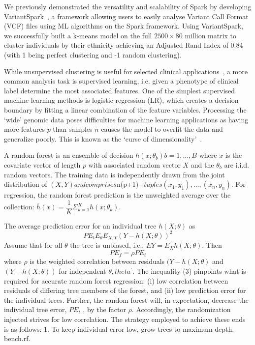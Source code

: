 \documentclass[10pt,letterpaper]{article}
\begin{document}
We previously demonstrated the versatility and scalability of Spark by developing VariantSpark~\cite{OBrien2015}, a
framework allowing users to easily analyse Variant Call Format (VCF) files using ML algorithms on the Spark framework.
Using VariantSpark, we successfully built a k-means model on the full
$2500 \times 80$ million matrix to cluster individuals by
their ethnicity achieving an Adjusted Rand Index of 0.84 (with 1 being perfect clustering  and -1 random clustering).


While unsupervised clustering is useful for selected clinical applications~\cite{Li2015}, a more common analysis task is
supervised learning, i.e. given a phenotype of clinical label determine the most associated features.  One of the
simplest supervised machine learning methods is logistic regression (LR), which creates a decision boundary by fitting a
linear combination of the feature variables.  Processing the `wide' genomic data poses difficulties for machine learning
applications as having more features $p$ than samples $n$ causes the model to overfit the data and generalize poorly.
This is known as the `curse of dimensionality'~\cite{Bauer2014}.  


A random forest is an ensemble  of decision $h(x; \theta_b) b=1, \ldots, B$ where
$x$ is the covariate vector of length $p$ with associated
random vector $X$ and the $\theta_b$ are i.i.d. random vectors. 
The training  data is independently drawn from the joint distribution of $(X,Y)
and comprises $n$  $(p+1)$-tuples (x_1,y_1),\ldots, (x_n,y_n)$.
For regression, the random forest prediction is the unweighted average over
the collection: $\bar{h}(x)=\dfrac{1}{K}\Sigma_{k=1}^K h(x; \theta_k)$.

The average prediction error for an individual tree $h(X; \theta)$ as
\begin{equation}
PE_t E_\theta E_{X,Y} (Y-h(X; \theta))^2
\end{equation}
Assume that for all  $\theta$ the tree is unbiased, i.e., $EY=E_Xh(X; \theta)$. Then
\begin{equation}
PE_f = \rho PE_t
\end{equation}
where $\rho$ is the weighted correlation between residuals
$(Y-h(X;\theta)$ and  $(Y-h(X;\theta))$
for independent $\theta, theta^\prime$.
The inequality (3) pinpoints what is required for accurate random forest regression:
(i) low correlation between residuals of differing tree members of
the forest, and (ii) low prediction error for the individual trees. Further, the
random forest will, in expectation, decrease the individual tree error, $PE_t$ , by
the factor $\rho$. Accordingly, the randomization injected strives for low correlation.
The strategy employed to achieve these ends is as follows:
1. To keep individual error low, grow trees to maximum depth.
bench.rf.
\end{document}

